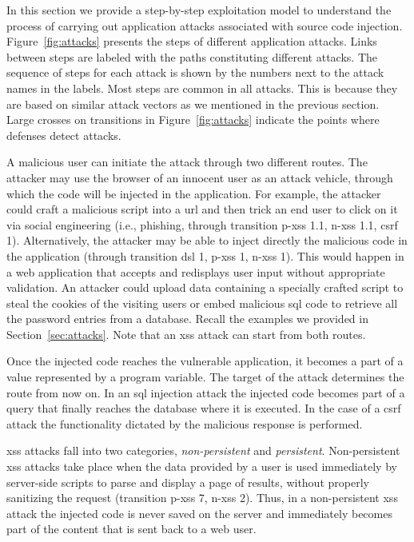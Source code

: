 \documentclass[conference]{IEEEtran}
\begin{document}
In this section we provide a step-by-step exploitation model to
understand the process of carrying out application attacks associated
with source code injection. Figure~\ref{fig:attacks}
presents the steps of different application attacks. Links between
steps are labeled with the paths constituting different attacks. The
sequence of steps for each attack is shown by the numbers next to the
attack names in the labels. Most steps are common in all attacks. This
is because they are based on similar attack vectors as we mentioned in
the previous section. Large crosses on transitions in
Figure~\ref{fig:attacks} indicate the points where defenses detect
attacks.

A malicious user can initiate the attack through two different routes.
The attacker may use the browser of an innocent user as an attack
vehicle, through which the code will be injected in the application.
For example, the attacker could craft a malicious script into a {\sc
  url} and then trick an end user to click on it via social
engineering (i.e., phishing, through transition {\sc p-xss} 1.1, {\sc
  n-xss} 1.1, {\sc csrf} 1). Alternatively, the attacker may be able
to inject directly the malicious code in the application (through
transition {\sc dsl} 1, {\sc p-xss} 1, {\sc n-xss} 1). This would happen
in a web application that accepts and redisplays user input
without appropriate validation. An attacker could upload data
containing a specially crafted script
to steal the cookies of the visiting users or embed malicious
{\sc sql} code to retrieve all the password entries from a database.
Recall the examples we provided in Section~\ref{sec:attacks}.
Note that an {\sc xss} attack can start from both routes.

Once the injected code reaches the vulnerable application, it becomes
a part of a value represented by a program variable. The target of the
attack determines the route from now on. In an {\sc sql} injection
attack the injected code becomes part of a query that
finally reaches the database where it is executed.
In the case of a {\sc csrf} attack the functionality dictated by
the malicious response is performed.

{\sc xss} attacks fall into two categories, {\it non-persistent} and
{\it persistent}. Non-persistent {\sc xss} attacks take place when the
data provided by a user is used immediately by server-side scripts to
parse and display a page of results, without properly sanitizing the
request (transition {\sc p-xss} 7, {\sc n-xss} 2).
Thus, in a non-persistent {\sc xss} attack the injected code
is never saved on the server and immediately becomes part of the
content that is sent back to a web user.
\end{document}
